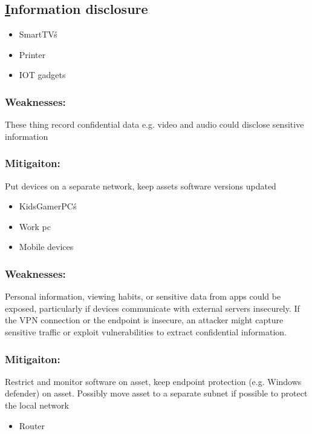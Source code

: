 \documentclass[
	letterpaper, %
	10pt, %
	unnumberedsections, %
	twoside, %
]{APAAssignment}
\begin{document}
\begin{singlespace}
\subsection{\underline{I}nformation disclosure}



	\begin{itemize}
		\item SmartTV\'s
		\item Printer 
		\item IOT gadgets 
	\end{itemize}
	
	\subsubsection{Weaknesses:} These thing record confidential data e.g. video and audio could disclose sensitive information  
	\subsubsection{Mitigaiton:} Put devices on a separate network, keep assets software versions updated
	
	\begin{itemize}
		\item KidsGamerPC\'s
		\item Work pc
		\item Mobile devices
	\end{itemize}
	
	\subsubsection{Weaknesses:} Personal information, viewing habits, or sensitive data from apps could be exposed, particularly if devices communicate with external servers insecurely. If the VPN connection or the endpoint is insecure, an attacker might capture sensitive traffic or exploit vulnerabilities to extract confidential information.

	\subsubsection{Mitigaiton:} Restrict and monitor software on asset, keep endpoint protection (e.g. Windows defender) on asset. Possibly move asset to a separate subnet if possible to protect the local network

	\begin{itemize}
		\item Router
	\end{itemize}
	

\end{singlespace}
\end{document}

